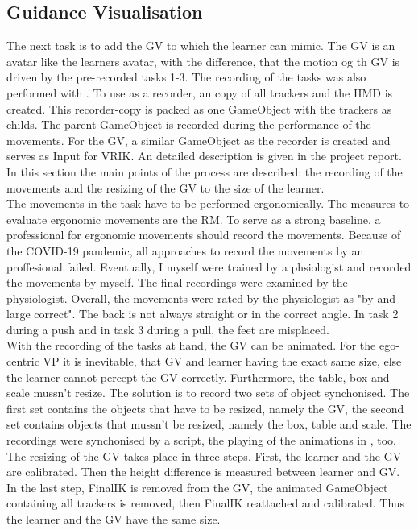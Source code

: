 \subsection{Guidance Visualisation}
\label{sec:gv}
The next task is to add the GV to \exgo which the learner can mimic. The GV is an avatar like the learners avatar, with the difference, that the motion og th GV is driven by the pre-recorded tasks 1-3. The recording of the tasks was also performed with \exgo. To use \exgo as a recorder, an copy of all trackers and the HMD is created. This recorder-copy is packed as one GameObject with the trackers as childs. The parent GameObject is recorded during the performance of the movements. For the GV, a similar GameObject as the recorder is created and serves as Input for VRIK. An detailed description is given in the project report. In this section the main points of the process are described: the recording of the movements and the resizing of the GV to the size of the learner.\\
The movements in the task have to be performed ergonomically. The measures to evaluate ergonomic movements are the RM. To serve as a strong baseline, a professional for ergonomic movements should record the movements. Because of the COVID-19 pandemic, all approaches to record the movements by an proffesional failed. Eventually, I myself were trained by a phsiologist and recorded the movements by myself. The final recordings were examined by the physiologist. Overall, the movements were rated by the physiologist as "by and large correct". The back is not always straight or in the correct angle. In task 2 during a push and in task 3 during a pull, the feet are misplaced.\\
With the recording of the tasks at hand, the GV can be animated. For the ego-centric VP it is inevitable, that GV and learner having the exact same size, else the learner cannot percept the GV correctly. Furthermore, the table, box and scale mussn't resize. The solution is to record two sets of object synchonised. The first set contains the objects that have to be resized, namely the GV, the second set contains objects that mussn't be resized, namely the box, table and scale. The recordings were synchonised by a script, the playing of the animations in \exgo, too. The resizing of the GV takes place in three steps. First, the learner and the GV are calibrated. Then the height difference is measured between learner and GV. In the last step, FinalIK is removed from the GV, the animated GameObject containing all trackers is removed, then FinalIK reattached and calibrated. Thus the learner and the GV have the same size.


